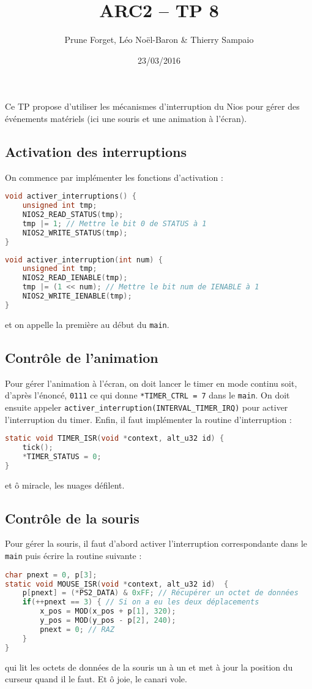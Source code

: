 \documentclass[a4paper,11pt]{article}
\title{ARC2 -- TP 8}
\author{Prune Forget, Léo Noël-Baron \& Thierry Sampaio}
\date{23/03/2016}
\begin{document}
\maketitle

Ce TP propose d'utiliser les mécanismes d'interruption du Nios pour gérer des événements matériels (ici une souris et une animation à l'écran).

\subsection*{Activation des interruptions}

On commence par implémenter les fonctions d'activation :
\begin{lstlisting}[language=C]
void activer_interruptions() {
	unsigned int tmp;
	NIOS2_READ_STATUS(tmp);
	tmp |= 1; // Mettre le bit 0 de STATUS à 1
	NIOS2_WRITE_STATUS(tmp);
}\end{lstlisting}
\begin{lstlisting}[language=C]
void activer_interruption(int num) {
	unsigned int tmp;
	NIOS2_READ_IENABLE(tmp);
	tmp |= (1 << num); // Mettre le bit num de IENABLE à 1
	NIOS2_WRITE_IENABLE(tmp);
}\end{lstlisting}
et on appelle la première au début du \verb?main?.

\subsection*{Contrôle de l'animation}

Pour gérer l'animation à l'écran, on doit lancer le timer en mode continu soit, d'après l'énoncé, \verb?0111? ce qui donne \verb?*TIMER_CTRL = 7? dans le \verb?main?. On doit ensuite appeler \verb?activer_interruption(INTERVAL_TIMER_IRQ)? pour activer l'interruption du timer. Enfin, il faut implémenter la routine d'interruption :
\begin{lstlisting}[language=C]
static void TIMER_ISR(void *context, alt_u32 id) {
	tick();
	*TIMER_STATUS = 0;
}\end{lstlisting}
et ô miracle, les nuages défilent.

\subsection*{Contrôle de la souris}

Pour gérer la souris, il faut d'abord activer l'interruption correspondante dans le \verb?main? puis écrire la routine suivante :
\begin{lstlisting}[language=C]
char pnext = 0, p[3];
static void MOUSE_ISR(void *context, alt_u32 id)  {
	p[pnext] = (*PS2_DATA) & 0xFF; // Récupérer un octet de données
	if(++pnext == 3) { // Si on a eu les deux déplacements
		x_pos = MOD(x_pos + p[1], 320);
		y_pos = MOD(y_pos - p[2], 240);
		pnext = 0; // RAZ
	}
}\end{lstlisting}
qui lit les octets de données de la souris un à un et met à jour la position du curseur quand il le faut. Et ô joie, le canari vole.
\end{document}
